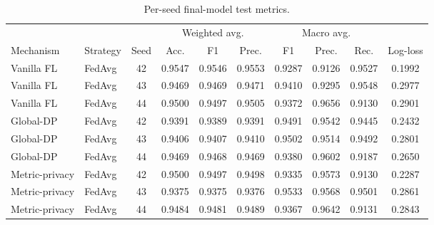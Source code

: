 \documentclass[11pt]{article}
\begin{document}
\begin{table}[h]
\centering
\caption{Per-seed final-model test metrics.}
\begin{tabular}{l l c ccc ccc c}
\toprule
& & & \multicolumn{3}{c}{Weighted avg.} & \multicolumn{3}{c}{Macro avg.} & \\
\cmidrule(lr){4-6}\cmidrule(lr){7-9}
Mechanism & Strategy & Seed & Acc. & F1 & Prec. & F1 & Prec. & Rec. & Log-loss \\
\midrule
Vanilla FL & FedAvg & 42 & 0.9547 & 0.9546 & 0.9553 & 0.9287 & 0.9126 & 0.9527 & 0.1992 \\
Vanilla FL & FedAvg & 43 & 0.9469 & 0.9469 & 0.9471 & 0.9410 & 0.9295 & 0.9548 & 0.2977 \\
Vanilla FL & FedAvg & 44 & 0.9500 & 0.9497 & 0.9505 & 0.9372 & 0.9656 & 0.9130 & 0.2901 \\
\midrule
Global-DP & FedAvg & 42 & 0.9391 & 0.9389 & 0.9391 & 0.9491 & 0.9542 & 0.9445 & 0.2432 \\
Global-DP & FedAvg & 43 & 0.9406 & 0.9407 & 0.9410 & 0.9502 & 0.9514 & 0.9492 & 0.2801 \\
Global-DP & FedAvg & 44 & 0.9469 & 0.9468 & 0.9469 & 0.9380 & 0.9602 & 0.9187 & 0.2650 \\
\midrule
Metric-privacy & FedAvg & 42 & 0.9500 & 0.9497 & 0.9498 & 0.9335 & 0.9573 & 0.9130 & 0.2287 \\
Metric-privacy & FedAvg & 43 & 0.9375 & 0.9375 & 0.9376 & 0.9533 & 0.9568 & 0.9501 & 0.2861 \\
Metric-privacy & FedAvg & 44 & 0.9484 & 0.9481 & 0.9489 & 0.9367 & 0.9642 & 0.9131 & 0.2843 \\
\bottomrule
\end{tabular}
\end{table}
\end{document}
